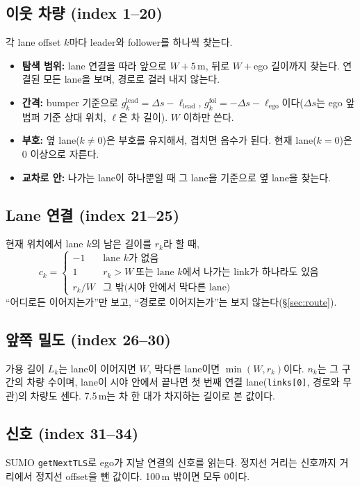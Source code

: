 \documentclass[10pt]{article}
\begin{document}
\subsection{이웃 차량 (index 1--20)}

각 lane offset $k$마다 leader와 follower를 하나씩 찾는다.
\begin{itemize}
  \item \textbf{탐색 범위:} lane 연결을 따라 앞으로 $W + 5$\,m, 뒤로 $W + {}$ego 길이까지 찾는다. 연결된 모든 lane을 보며, 경로로 걸러 내지 않는다.
  \item \textbf{간격:} bumper 기준으로 $g^{\mathrm{lead}}_k = \Delta s - \ell_{\mathrm{lead}}$, $g^{\mathrm{fol}}_k = -\Delta s - \ell_{\mathrm{ego}}$이다($\Delta s$는 ego 앞 범퍼 기준 상대 위치, $\ell$은 차 길이). $W$ 이하만 쓴다.
  \item \textbf{부호:} 옆 lane($k \ne 0$)은 부호를 유지해서, 겹치면 음수가 된다. 현재 lane($k=0$)은 0 이상으로 자른다.
  \item \textbf{교차로 안:} 나가는 lane이 하나뿐일 때 그 lane을 기준으로 옆 lane을 찾는다.
\end{itemize}

\subsection{Lane 연결 (index 21--25)}\label{sec:conn}
현재 위치에서 lane $k$의 남은 길이를 $r_k$라 할 때,
\[
c_k = \begin{cases}
-1 & \text{lane } k \text{가 없음} \\
1 & r_k > W \ \text{또는 lane } k \text{에서 나가는 link가 하나라도 있음} \\
r_k / W & \text{그 밖(시야 안에서 막다른 lane)}
\end{cases}
\]
``어디로든 이어지는가''만 보고, ``경로로 이어지는가''는 보지 않는다(\S\ref{sec:route}).

\subsection{앞쪽 밀도 (index 26--30)}
가용 길이 $L_k$는 lane이 이어지면 $W$, 막다른 lane이면 $\min(W, r_k)$이다. $n_k$는 그 구간의 차량 수이며, lane이 시야 안에서 끝나면 첫 번째 연결 lane(\texttt{links[0]}, 경로와 무관)의 차량도 센다. 7.5\,m는 차 한 대가 차지하는 길이로 본 값이다.

\subsection{신호 (index 31--34)}
SUMO \texttt{getNextTLS}로 ego가 지날 연결의 신호를 읽는다. 정지선 거리는 신호까지 거리에서 정지선 offset을 뺀 값이다. 100\,m 밖이면 모두 0이다.
\end{document}
